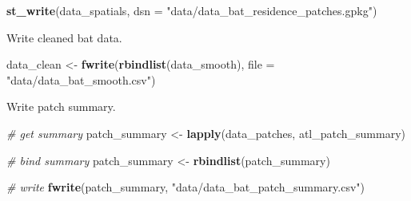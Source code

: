 \documentclass[
]{scrartcl}
\newenvironment{Shaded}{}{}
\newcommand{\CommentTok}[1]{\textcolor[rgb]{0.38,0.63,0.69}{\textit{#1}}}
\newcommand{\DataTypeTok}[1]{\textcolor[rgb]{0.56,0.13,0.00}{#1}}
\newcommand{\KeywordTok}[1]{\textcolor[rgb]{0.00,0.44,0.13}{\textbf{#1}}}
\newcommand{\NormalTok}[1]{#1}
\newcommand{\StringTok}[1]{\textcolor[rgb]{0.25,0.44,0.63}{#1}}
\begin{document}
\begin{Shaded}
\begin{Highlighting}[]
\KeywordTok{st\_write}\NormalTok{(data\_spatials,}
         \DataTypeTok{dsn =} \StringTok{"data/data\_bat\_residence\_patches.gpkg"}\NormalTok{)}
\end{Highlighting}
\end{Shaded}

Write cleaned bat data.

\begin{Shaded}
\begin{Highlighting}[]
\NormalTok{data\_clean <{-}}\StringTok{ }\KeywordTok{fwrite}\NormalTok{(}\KeywordTok{rbindlist}\NormalTok{(data\_smooth),}
                     \DataTypeTok{file =} \StringTok{"data/data\_bat\_smooth.csv"}\NormalTok{)}
\end{Highlighting}
\end{Shaded}

Write patch summary.

\begin{Shaded}
\begin{Highlighting}[]
\CommentTok{\# get summary}
\NormalTok{patch\_summary <{-}}\StringTok{ }\KeywordTok{lapply}\NormalTok{(data\_patches, atl\_patch\_summary)}

\CommentTok{\# bind summary}
\NormalTok{patch\_summary <{-}}\StringTok{ }\KeywordTok{rbindlist}\NormalTok{(patch\_summary)}

\CommentTok{\# write}
\KeywordTok{fwrite}\NormalTok{(patch\_summary,}
       \StringTok{"data/data\_bat\_patch\_summary.csv"}\NormalTok{)}
\end{Highlighting}
\end{Shaded}
\end{document}
